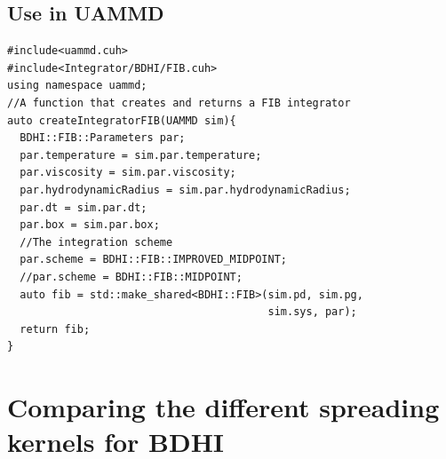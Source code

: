 \documentclass[ twoside,openright,titlepage,numbers=noenddot,%
headinclude,footinclude,cleardoublepage=empty,abstract=on,
BCOR=5mm,paper=a4,fontsize=11pt, dvipsnames
]{scrreprt}
\def\ucpp{uammd_cpp_lexer.py:UAMMDCppLexer -x}
\begin{document}
\subsection*{Use in UAMMD}

\begin{verbatim}
#include<uammd.cuh>
#include<Integrator/BDHI/FIB.cuh>
using namespace uammd;
//A function that creates and returns a FIB integrator
auto createIntegratorFIB(UAMMD sim){   
  BDHI::FIB::Parameters par;
  par.temperature = sim.par.temperature;
  par.viscosity = sim.par.viscosity;
  par.hydrodynamicRadius = sim.par.hydrodynamicRadius;
  par.dt = sim.par.dt;  
  par.box = sim.par.box;
  //The integration scheme
  par.scheme = BDHI::FIB::IMPROVED_MIDPOINT;
  //par.scheme = BDHI::FIB::MIDPOINT;
  auto fib = std::make_shared<BDHI::FIB>(sim.pd, sim.pg, 
                                         sim.sys, par);
  return fib;
}
\end{verbatim}


\section{Comparing the different spreading kernels for BDHI}\label{sec:kernelcomp}
\end{document}
